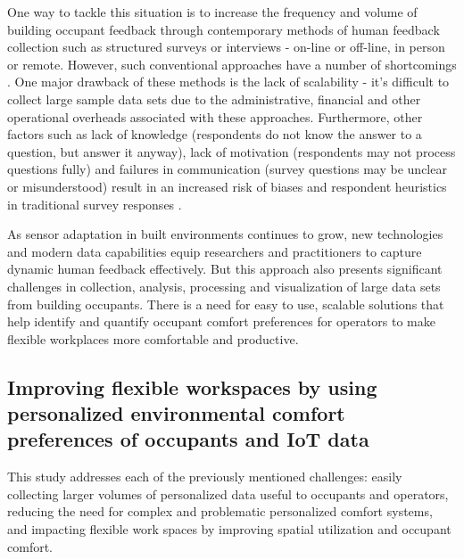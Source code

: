 \documentclass[]{interact}
\theoremstyle{plain}%
\theoremstyle{definition}
\theoremstyle{remark}
\begin{document}
One way to tackle this situation is to increase the frequency and volume of building occupant feedback through contemporary methods of human feedback collection such as structured surveys or interviews - on-line or off-line, in person or remote. However, such conventional approaches have a number of shortcomings \cite{oecd}. One major drawback of these methods is the lack of scalability - it’s difficult to collect large sample data sets due to the administrative, financial and other operational overheads associated with these approaches. Furthermore, other factors such as lack of knowledge (respondents do not know the answer to a question, but answer it anyway), lack of motivation (respondents may not process questions fully) and failures in communication (survey questions may be unclear or misunderstood) result in an increased risk of biases and respondent heuristics in traditional survey responses \cite{bradburn2004asking}.

As sensor adaptation in built environments continues to grow, new technologies and modern data capabilities equip researchers and practitioners to capture dynamic human feedback effectively. But this approach also presents significant challenges in collection, analysis, processing and visualization of large data sets from building occupants. There is a need for easy to use, scalable solutions that help identify and quantify occupant comfort preferences for operators to make flexible workplaces more comfortable and productive.


\subsection{Improving flexible workspaces by using personalized environmental comfort preferences of occupants and IoT data}

This study addresses each of the previously mentioned challenges: easily collecting larger volumes of personalized data useful to occupants and operators, reducing the need for complex and problematic personalized comfort systems, and impacting flexible work spaces by improving spatial utilization and occupant comfort. 
\end{document}
